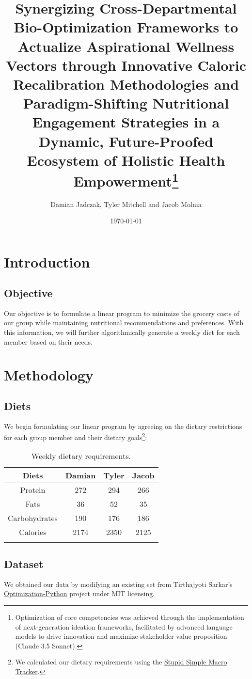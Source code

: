 \documentclass[12pt, english]{report}
\title{Synergizing Cross-Departmental Bio-Optimization Frameworks to Actualize Aspirational Wellness Vectors through Innovative Caloric Recalibration Methodologies and Paradigm-Shifting Nutritional Engagement Strategies in a Dynamic, Future-Proofed Ecosystem of Holistic Health Empowerment\footnote{Optimization of core competencies was achieved through the implementation of next-generation ideation frameworks, facilitated by advanced language models to drive innovation and maximize stakeholder value proposition (Claude 3.5 Sonnet).}}
\author{Damian Jadczak, Tyler Mitchell and Jacob Molnia}
\date\today
\begin{document}
\maketitle
\tableofcontents
\pagebreak
\chapter{Introduction}
\vspace*{-1in}
\section{Objective}
Our objective is to formulate a linear program to minimize the grocery costs of our group while maintaining nutritional recommendations and preferences. With this information, we will further algorithmically generate a weekly diet for each member based on their needs.
\chapter{Methodology}
\vspace*{-1in}
\section{Diets}
We begin formulating our linear program by agreeing on the dietary restrictions for each group member and their dietary goals\footnote{We calculated our dietary requirements using the \href{https://apps.apple.com/us/app/stupid-simple-macro-tracker/id1210995590}{Stupid Simple Macro Tracker}.}:
\begin{table}[H]
    \centering
    \caption[short]{Weekly dietary requirements.}
    \begin{tabular}{cccc}
        \toprule
        Diets & Damian & Tyler & Jacob\\ 
        \midrule
        Protein & 272 &294 & 266 \\ 
        Fats &36 &52 & 35\\ 
        Carbohydrates &190 &176 & 186 \\
        Calories &2174 &2350 & 2125 \\
    \bottomrule
    \label{tab:diet}
    \end{tabular}
\end{table}
\section{Dataset}
We obtained our data by modifying an existing set from Tirthajyoti Sarkar's \href{https://github.com/tirthajyoti/Optimization-Python/blob/master/Data/diet.xls}{Optimization-Python} project under MIT licensing.
\pagebreak
\printbibliography
\end{document}
